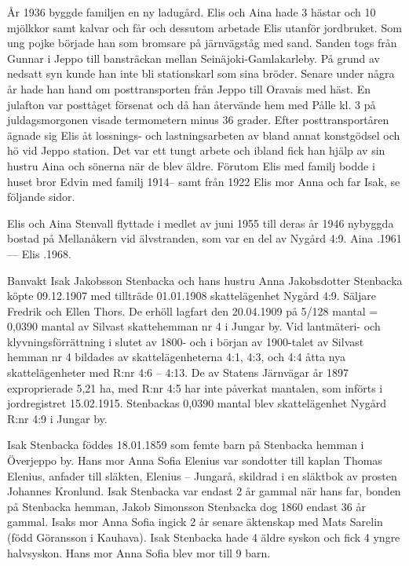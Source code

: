 År 1936 byggde familjen en ny ladugård. Elis och Aina hade 3 hästar och 10 mjölkkor samt kalvar och får och dessutom arbetade Elis utanför jordbruket. Som ung pojke började han som bromsare på järnvägståg med sand. Sanden togs från Gunnar i Jeppo till bansträckan mellan Seinäjoki-Gamlakarleby. På grund av nedsatt syn kunde han inte bli stationskarl som sina bröder. Senare under några år hade han hand om posttransporten från Jeppo till Oravais med häst. En julafton var posttåget försenat och då han återvände hem med Pålle kl. 3 på juldagsmorgonen visade termometern minus 36 grader.  Efter posttransportåren ägnade sig Elis åt lossnings- och lastningsarbeten av bland annat konstgödsel och hö vid Jeppo station. Det var ett tungt arbete och ibland fick han hjälp av sin hustru Aina och sönerna när de blev äldre.
Förutom Elis med familj bodde i huset bror Edvin med familj 1914-- samt från 1922 Elis mor Anna och far Isak, se följande sidor.

Elis och Aina Stenvall flyttade i medlet av juni 1955 till deras år 1946 nybyggda bostad på Mellanåkern vid älvstranden, som var en del av Nygård 4:9. Aina .1961  ---  Elis .1968.


Banvakt Isak Jakobsson Stenbacka och hans hustru Anna Jakobsdotter Stenbacka köpte 09.12.1907 med tillträde 01.01.1908 skattelägenhet Nygård 4:9. Säljare Fredrik och Ellen Thors. De erhöll lagfart den 20.04.1909 på 5/128 mantal = 0,0390 mantal av Silvast skattehemman nr 4 i Jungar by. Vid lantmäteri- och klyvningsförrättning i slutet av 1800- och i början av 1900-talet av Silvast hemman nr 4 bildades av skattelägenheterna 4:1, 4:3, och 4:4  åtta nya skattelägenheter med R:nr 4:6 – 4:13. De av Statens Järnvägar år 1897 exproprierade 5,21 ha, med R:nr 4:5 har inte påverkat mantalen, som införts i jordregistret 15.02.1915. Stenbackas 0,0390 mantal blev skattelägenhet Nygård R:nr 4:9 i Jungar by.

Isak Stenbacka föddes 18.01.1859 som femte barn på Stenbacka hemman i Överjeppo by. Hans mor Anna Sofia Elenius var sondotter till kaplan Thomas Elenius, anfader till släkten, Elenius – Jungarå, skildrad i en släktbok av prosten Johannes Kronlund. Isak Stenbacka var endast 2 år gammal när hans far, bonden på Stenbacka hemman, Jakob Simonsson Stenbacka dog 1860 endast 36 år gammal. Isaks mor Anna Sofia ingick 2 år senare äktenskap med Mats Sarelin (född Göransson i Kauhava). Isak Stenbacka hade 4 äldre syskon och fick 4 yngre halvsyskon. Hans mor Anna Sofia blev mor till 9 barn.

